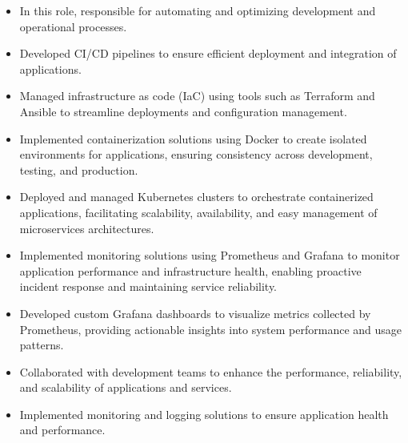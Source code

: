 \documentclass[../main.tex]{subfiles}
\begin{document}
\begin{category}
    \begin{itemize}
        \item In this role, responsible for automating and optimizing development and operational processes.
        \item Developed CI/CD pipelines to ensure efficient deployment and integration of applications.
        \item Managed infrastructure as code (IaC) using tools such as Terraform and Ansible to streamline deployments and configuration management.
        \item Implemented containerization solutions using Docker to create isolated environments for applications, ensuring consistency across development, testing, and production.
        \item Deployed and managed Kubernetes clusters to orchestrate containerized applications, facilitating scalability, availability, and easy management of microservices architectures.
        \item Implemented monitoring solutions using Prometheus and Grafana to monitor application performance and infrastructure health, enabling proactive incident response and maintaining service reliability.
        \item Developed custom Grafana dashboards to visualize metrics collected by Prometheus, providing actionable insights into system performance and usage patterns.
        \item Collaborated with development teams to enhance the performance, reliability, and scalability of applications and services.
        \item Implemented monitoring and logging solutions to ensure application health and performance.
    \end{itemize}
    
\end{category}
\end{document}
